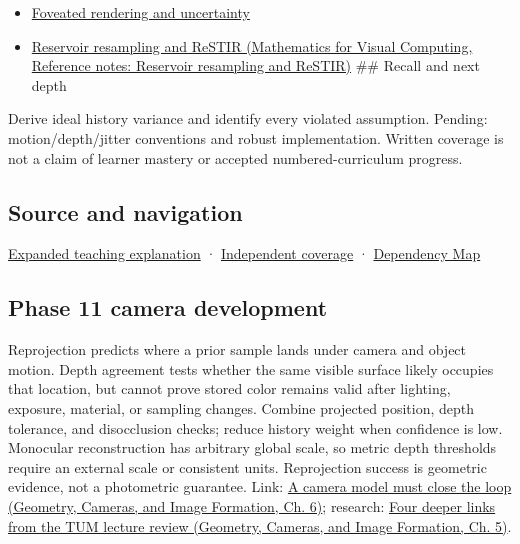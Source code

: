 \hypertarget{appendix-0727340a4428-used-by}{}

\begin{itemize}
\item
  \hyperref[appendix-5878b813b732]{Foveated rendering and uncertainty}
\item
  \href{../02-Mathematics-for-Visual-Computing/main.pdf\#nameddest=appendix-68be451b78b1}{Reservoir resampling and ReSTIR (Mathematics for Visual Computing, Reference notes: Reservoir resampling and ReSTIR)} \#\# Recall and next depth
\end{itemize}

Derive ideal history variance and identify every violated assumption. Pending: motion/depth/jitter conventions and robust implementation. Written coverage is not a claim of learner mastery or accepted numbered-curriculum progress.

\subsection{Source and navigation}\label{appendix-0727340a4428-source-and-navigation}

\hypertarget{appendix-0727340a4428-source-and-navigation}{}

\hyperref[04-visual-computing-ii-ch042-temporal-reconstruction-is-an-inference-about-correspondence]{Expanded teaching explanation} · \hyperref[appendix-fd090d982a15-xr01---independent-seeing-and-representation-source]{Independent coverage} · \hyperref[appendix-4ad47bdd269a]{Dependency Map}

\subsection{Phase 11 camera development}\label{appendix-0727340a4428-phase-11-camera-development}

\hypertarget{appendix-0727340a4428-phase-11-camera-development}{}

Reprojection predicts where a prior sample lands under camera and object motion. Depth agreement tests whether the same visible surface likely occupies that location, but cannot prove stored color remains valid after lighting, exposure, material, or sampling changes. Combine projected position, depth tolerance, and disocclusion checks; reduce history weight when confidence is low. Monocular reconstruction has arbitrary global scale, so metric depth thresholds require an external scale or consistent units. Reprojection success is geometric evidence, not a photometric guarantee. Link: \href{../03-Geometry-Cameras-and-Image-Formation/main.pdf\#nameddest=02-foundations-ii-ch037-a-camera-model-must-close-the-loop}{A camera model must close the loop (Geometry, Cameras, and Image Formation, Ch. 6)}; research: \href{../03-Geometry-Cameras-and-Image-Formation/main.pdf\#nameddest=02-foundations-ii-ch036-four-deeper-links-from-the-tum-lecture-review}{Four deeper links from the TUM lecture review (Geometry, Cameras, and Image Formation, Ch. 5)}.

